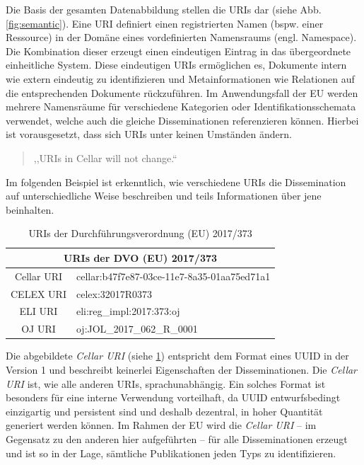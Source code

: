 Die Basis der gesamten Datenabbildung stellen die \acfp{URI} dar (siehe Abb. \ref{fig:semantic}).
Eine URI definiert einen registrierten Namen (bspw. einer Ressource) in der Domäne eines vordefinierten Namensraums (engl. Namespace).
Die Kombination dieser erzeugt einen eindeutigen Eintrag in das übergeordnete einheitliche System.
\cite[2]{eu_uri_rfc1630}
Diese eindeutigen \acp{URI} ermöglichen es, Dokumente intern wie extern eindeutig zu identifizieren und Metainformationen wie Relationen auf die entsprechenden Dokumente rückzuführen.
Im Anwendungsfall der \ac{EU} werden mehrere Namensräume für verschiedene Kategorien oder Identifikationsschemata verwendet, welche auch die gleiche Disseminationen referenzieren können.
Hierbei ist vorausgesetzt, dass sich \acp{URI} unter keinen Umständen ändern.
\begin{quote}
    ,,URIs in Cellar will not change.`` \cite[9]{eu_cellar}
\end{quote}
Im folgenden Beispiel ist erkenntlich, wie verschiedene \acp{URI} die Dissemination auf unterschiedliche Weise beschreiben und teils Informationen über jene beinhalten.

\begin{table}[h]
    \centering
    \begin{tabular}{|c|l|} \hline 
         \multicolumn{2}{|c|}{URIs der DVO (EU) 2017/373}\\ \hline 
         Cellar URI& cellar:b47f7e87-03ce-11e7-8a35-01aa75ed71a1\\ \hline 
         CELEX URI& celex:32017R0373\\ \hline 
         ELI URI&eli:reg\_impl:2017:373:oj\\ \hline
         OJ URI&oj:JOL\_2017\_062\_R\_0001\\ \hline 
    \end{tabular}
    \caption{URIs der Durchführungsverordnung (EU) 2017/373}
    \label{tab:uris}
\end{table}

Die abgebildete \textit{Cellar URI} (siehe \ref{tab:uris}) entspricht dem Format eines \acf{UUID} in der Version 1 und beschreibt keinerlei Eigenschaften der Disseminationen.
Die \textit{Cellar URI} ist, wie alle anderen \acp{URI}, sprachunabhängig.
Ein solches Format ist besonders für eine interne Verwendung vorteilhaft, da \ac{UUID} entwurfsbedingt einzigartig und persistent sind und deshalb dezentral, in hoher Quantität generiert werden können.  
\cite[2]{eu_uuid_rfc4122}
Im Rahmen der EU wird die \textit{Cellar \ac{URI}} -- im Gegensatz zu den anderen hier aufgeführten -- für alle Disseminationen erzeugt und ist so in der Lage, sämtliche Publikationen jeden Typs zu identifizieren.  

